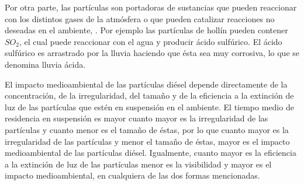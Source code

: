 \par Por otra parte, las partículas son portadoras de sustancias que pueden reaccionar con los distintos gases de la atmósfera o que pueden catalizar reacciones no deseadas en el ambiente, \cite{merolaetal:2001}. Por ejemplo las partículas de hollín pueden contener $SO_2$, el cual puede reaccionar con el agua y producir ácido sulfúrico. El ácido sulfúrico es arrastrado por la lluvia haciendo que ésta sea muy corrosiva, lo que se denomina lluvia ácida.

\par El impacto medioambiental de las partículas diésel depende directamente de la concentración, de la irregularidad, del tamaño y de la eficiencia a la extinción de luz de las partículas que estén en suspensión en el ambiente. El tiempo medio de residencia en suspensión es mayor cuanto mayor es la irregularidad de las partículas y cuanto menor es el tamaño de éstas, por lo que cuanto mayor es la irregularidad de las partículas y menor el tamaño de éstas, mayor es el impacto medioambiental de las partículas diésel. Igualmente, cuanto mayor es la eficiencia a la extinción de luz de las partículas menor es la visibilidad y mayor es el impacto medioambiental, en cualquiera de las dos formas mencionadas. 
 
\newpage
		
